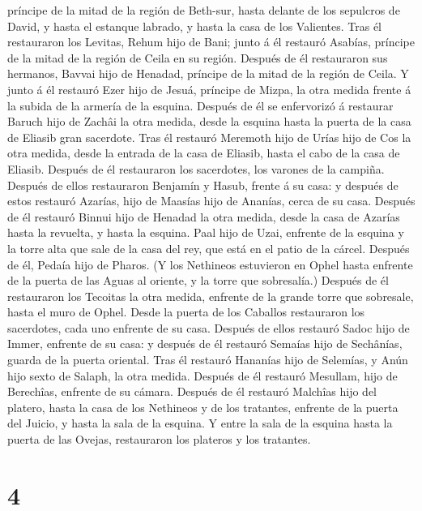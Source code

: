 príncipe de la mitad de la región de Beth-sur, hasta delante de los
sepulcros de David, y hasta el estanque labrado, y hasta la casa de los
Valientes.  Tras él restauraron los Levitas, Rehum hijo
de Bani; junto á él restauró Asabías, príncipe de la mitad de la región
de Ceila en su región.  Después de él restauraron sus
hermanos, Bavvai hijo de Henadad, príncipe de la mitad de la región de
Ceila.  Y junto á él restauró Ezer hijo de Jesuá,
príncipe de Mizpa, la otra medida frente á la subida de la armería de la
esquina.  Después de él se enfervorizó á restaurar Baruch
hijo de Zachâi la otra medida, desde la esquina hasta la puerta de la
casa de Eliasib gran sacerdote.  Tras él restauró
Meremoth hijo de Urías hijo de Cos la otra medida, desde la entrada de
la casa de Eliasib, hasta el cabo de la casa de Eliasib. 
Después de él restauraron los sacerdotes, los varones de la campiña.
 Después de ellos restauraron Benjamín y Hasub, frente á
su casa: y después de estos restauró Azarías, hijo de Maasías hijo de
Ananías, cerca de su casa.  Después de él restauró Binnui
hijo de Henadad la otra medida, desde la casa de Azarías hasta la
revuelta, y hasta la esquina.  Paal hijo de Uzai,
enfrente de la esquina y la torre alta que sale de la casa del rey, que
está en el patio de la cárcel. Después de él, Pedaía hijo de Pharos.
 (Y los Nethineos estuvieron en Ophel hasta enfrente de
la puerta de las Aguas al oriente, y la torre que sobresalía.)
 Después de él restauraron los Tecoitas la otra medida,
enfrente de la grande torre que sobresale, hasta el muro de Ophel.
 Desde la puerta de los Caballos restauraron los
sacerdotes, cada uno enfrente de su casa.  Después de
ellos restauró Sadoc hijo de Immer, enfrente de su casa: y después de él
restauró Semaías hijo de Sechânías, guarda de la puerta oriental.
 Tras él restauró Hananías hijo de Selemías, y Anún hijo
sexto de Salaph, la otra medida. Después de él restauró Mesullam, hijo
de Berechîas, enfrente de su cámara.  Después de él
restauró Malchîas hijo del platero, hasta la casa de los Nethineos y de
los tratantes, enfrente de la puerta del Juicio, y hasta la sala de la
esquina.  Y entre la sala de la esquina hasta la puerta
de las Ovejas, restauraron los plateros y los tratantes.

\hypertarget{section-3}{%
\section{4}\label{section-3}}

